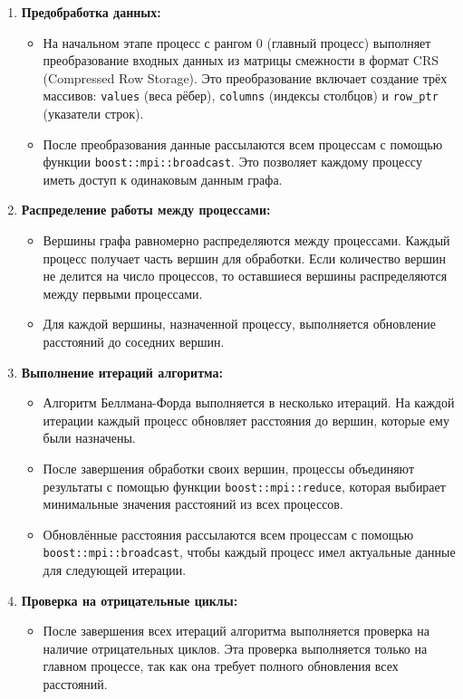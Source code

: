 \documentclass[12pt]{article}
\begin{document}
\begin{enumerate}[leftmargin=*,itemsep=5pt]
    \item \textbf{Предобработка данных:}
    \begin{itemize}
        \item На начальном этапе процесс с рангом 0 (главный процесс) выполняет преобразование входных данных из матрицы смежности в формат CRS (Compressed Row Storage). Это преобразование включает создание трёх массивов: \texttt{values} (веса рёбер), \texttt{columns} (индексы столбцов) и \texttt{row\_ptr} (указатели строк).
        \item После преобразования данные рассылаются всем процессам с помощью функции \texttt{boost::mpi::broadcast}. Это позволяет каждому процессу иметь доступ к одинаковым данным графа.
    \end{itemize}
    
    \item \textbf{Распределение работы между процессами:}
    \begin{itemize}
        \item Вершины графа равномерно распределяются между процессами. Каждый процесс получает часть вершин для обработки. Если количество вершин не делится на число процессов, то оставшиеся вершины распределяются между первыми процессами.
        \item Для каждой вершины, назначенной процессу, выполняется обновление расстояний до соседних вершин.
    \end{itemize}
    
    \item \textbf{Выполнение итераций алгоритма:}
    \begin{itemize}
        \item Алгоритм Беллмана-Форда выполняется в несколько итераций. На каждой итерации каждый процесс обновляет расстояния до вершин, которые ему были назначены.
        \item После завершения обработки своих вершин, процессы объединяют результаты с помощью функции \texttt{boost::mpi::reduce}, которая выбирает минимальные значения расстояний из всех процессов.
        \item Обновлённые расстояния рассылаются всем процессам с помощью \texttt{boost::mpi::broadcast}, чтобы каждый процесс имел актуальные данные для следующей итерации.
    \end{itemize}
    
    \item \textbf{Проверка на отрицательные циклы:}
    \begin{itemize}
        \item После завершения всех итераций алгоритма выполняется проверка на наличие отрицательных циклов. Эта проверка выполняется только на главном процессе, так как она требует полного обновления всех расстояний.
    \end{itemize}
    

\end{enumerate}
\end{document}
